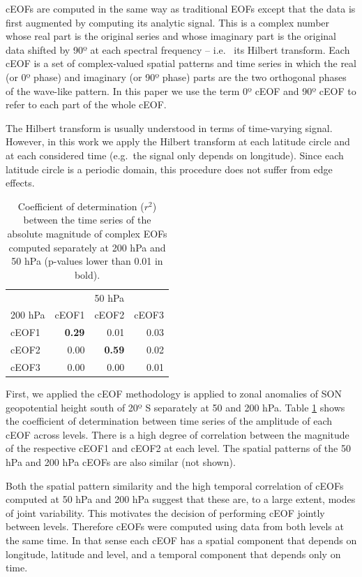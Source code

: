 \documentclass[pdflatex,sn-basic]{sn-jnl}
\theoremstyle{thmstyleone}%
\theoremstyle{thmstyletwo}%
\theoremstyle{thmstylethree}%
\begin{document}
cEOFs are computed in the same way as traditional EOFs except that the data is first augmented by computing its analytic signal.
This is a complex number whose real part is the original series and whose imaginary part is the original data shifted by 90º at each spectral frequency -- i.e.~
its Hilbert transform. Each cEOF is a set of complex-valued spatial patterns and time series in which the real (or 0º phase) and imaginary (or 90º phase) parts are the two orthogonal phases of the wave-like pattern.
In this paper we use the term 0º cEOF and 90º cEOF to refer to each part of the whole cEOF.

The Hilbert transform is usually understood in terms of time-varying signal.
However, in this work we apply the Hilbert transform at each latitude circle and at each considered time (e.g.~the signal only depends on longitude).
Since each latitude circle is a periodic domain, this procedure does not suffer from edge effects.



\begin{table}

\caption{\label{tab:corr-ceof-splitted}Coefficient of determination (\(r^2\)) between the time series of the absolute magnitude of complex EOFs computed separately at 200 hPa and 50 hPa (p-values lower than 0.01 in bold).}
\centering
\begin{tabular}[t]{l>{}r>{}r>{}r}
\toprule
\multicolumn{1}{c}{} & \multicolumn{3}{c}{50 hPa} \\
\cmidrule(l{3pt}r{3pt}){2-4}
200 hPa & cEOF1 & cEOF2 & cEOF3\\
\midrule
cEOF1 & \textbf{0.29} & 0.01 & 0.03\\
cEOF2 & 0.00 & \textbf{0.59} & 0.02\\
cEOF3 & 0.00 & 0.00 & 0.01\\
\bottomrule
\end{tabular}
\end{table}

First, we applied the cEOF methodology is applied to zonal anomalies of SON geopotential height south of 20º S separately at 50 and 200 hPa.
Table \ref{tab:corr-ceof-splitted} shows the coefficient of determination between time series of the amplitude of each cEOF across levels.
There is a high degree of correlation between the magnitude of the respective cEOF1 and cEOF2 at each level.
The spatial patterns of the 50 hPa and 200 hPa cEOFs are also similar (not shown).

Both the spatial pattern similarity and the high temporal correlation of cEOFs computed at 50 hPa and 200 hPa suggest that these are, to a large extent, modes of joint variability.
This motivates the decision of performing cEOF jointly between levels.
Therefore cEOFs were computed using data from both levels at the same time.
In that sense each cEOF has a spatial component that depends on longitude, latitude and level, and a temporal component that depends only on time.
\end{document}
